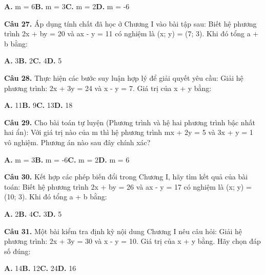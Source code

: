 \documentclass[11pt,a4paper]{article}
\begin{document}
\hspace*{1.5em}\textbf{A.} m = 6\quad\quad \textbf{B.} m = 3\quad\quad \textbf{C.} m = 2\quad\quad \textbf{D.} m = -6\par\vspace{2pt}
\textbf{\color{primary} Câu 27.} Áp dụng tính chất đã học ở Chương I vào bài tập sau: Biết hệ phương trình 2x + by = 20 và ax - y = 11 có nghiệm là (x; y) = (7; 3). Khi đó tổng a + b bằng:\par
\hspace*{1.5em}\textbf{A.} 3\quad\quad \textbf{B.} 2\quad\quad \textbf{C.} 4\quad\quad \textbf{D.} 5\par\vspace{2pt}
\textbf{\color{primary} Câu 28.} Thực hiện các bước suy luận hợp lý để giải quyết yêu cầu: Giải hệ phương trình: 2x + 3y = 24 và x - y = 7. Giá trị của x + y bằng:\par
\hspace*{1.5em}\textbf{A.} 11\quad\quad \textbf{B.} 9\quad\quad \textbf{C.} 13\quad\quad \textbf{D.} 18\par\vspace{2pt}
\textbf{\color{primary} Câu 29.} Cho bài toán tự luyện (Phương trình và hệ hai phương trình bậc nhất hai ẩn): Với giá trị nào của m thì hệ phương trình mx + 2y = 5 và 3x + y = 1 vô nghiệm. Phương án nào sau đây chính xác?\par
\hspace*{1.5em}\textbf{A.} m = 3\quad\quad \textbf{B.} m = -6\quad\quad \textbf{C.} m = 2\quad\quad \textbf{D.} m = 6\par\vspace{2pt}
\textbf{\color{primary} Câu 30.} Kết hợp các phép biến đổi trong Chương I, hãy tìm kết quả của bài toán: Biết hệ phương trình 2x + by = 26 và ax - y = 17 có nghiệm là (x; y) = (10; 3). Khi đó tổng a + b bằng:\par
\hspace*{1.5em}\textbf{A.} 2\quad\quad \textbf{B.} 4\quad\quad \textbf{C.} 3\quad\quad \textbf{D.} 5\par\vspace{2pt}
\textbf{\color{primary} Câu 31.} Một bài kiểm tra định kỳ nội dung Chương I nêu câu hỏi: Giải hệ phương trình: 2x + 3y = 30 và x - y = 10. Giá trị của x + y bằng. Hãy chọn đáp số đúng:\par
\hspace*{1.5em}\textbf{A.} 14\quad\quad \textbf{B.} 12\quad\quad \textbf{C.} 24\quad\quad \textbf{D.} 16\par\vspace{2pt}
\end{document}
